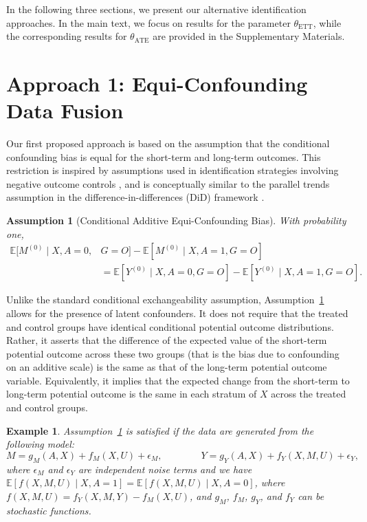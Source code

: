 \documentclass[10pt]{article}
\newtheorem{example}{Example}
\newtheorem{assumption}{Assumption}
\newcommand{\E}{\mathbb{E}}
\begin{document}
In the following three sections, we present our alternative identification approaches. In the main text, we focus on results for the parameter $\theta_{\text{ETT}}$, while the corresponding results for $\theta_{\text{ATE}}$ are provided in the Supplementary Materials.


\section{Approach 1: Equi-Confounding Data Fusion}
\label{sec:AltIDAss}

Our first proposed approach is based on the assumption that the conditional confounding bias is equal for the short-term and long-term outcomes. This restriction is inspired by assumptions used in identification strategies involving negative outcome controls \citep{lipsitch2010negative,tchetgen2014control,sofer2016negative}, and is conceptually similar to the parallel trends assumption in the difference-in-differences (DiD) framework \citep{card1990impact,angrist2008mostly}.

\begin{assumption}[Conditional Additive Equi-Confounding Bias]
\label{assumption:CondEqui}
With probability one,
\begin{align*}
\E[M^{(0)}\mid X,A=0,&G=O]-\E[M^{(0)}\mid  X,A=1,G=O]\\
&=\E[Y^{(0)}\mid  X,A=0,G=O]-\E[Y^{(0)}\mid  X,A=1,G=O].
\end{align*}	
\end{assumption}
Unlike the standard conditional exchangeability assumption, Assumption~\ref{assumption:CondEqui} allows for the presence of latent confounders. It does not require that the treated and control groups have identical conditional potential outcome distributions. Rather, it asserts that the difference of the expected value of the short-term potential outcome across these two groups (that is the bias due to confounding on an additive scale) is the same as that of the long-term potential outcome variable. Equivalently, it implies that the expected change from the short-term to long-term potential outcome is the same in each stratum of $X$ across the treated and control groups.
\begin{example}
Assumption~\ref{assumption:CondEqui} is satisfied if the data are generated from the following model:
\[
M = g_M(A, X) + f_M(X, U) + \epsilon_M, 
\qquad \qquad Y = g_Y(A, X) + f_Y(X, M, U) + \epsilon_Y,
\]
where $\epsilon_M$ and $\epsilon_Y$ are independent noise terms and we have $\E[f(X,M,U)\mid X,A=1]=\E[f(X,M,U)\mid X,A=0]$, where $f(X,M,U)=f_Y(X,M,Y)-f_M(X,U)$, and $g_M$, $f_M$, $g_Y$, and $f_Y$ can be stochastic functions.
\end{example}
\end{document}

